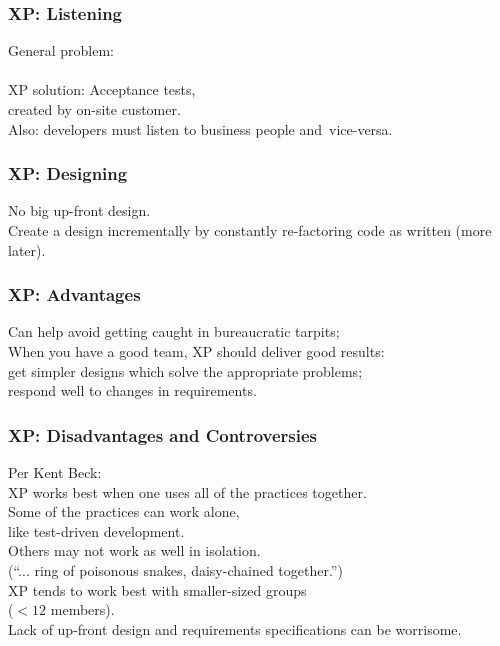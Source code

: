 \begin{frame}
\frametitle{XP: Listening}
\begin{changemargin}{2cm}

General problem: \\
\qquad {}\\[1em]

XP solution: Acceptance tests,\\
created by on-site customer.\\[1em]

Also: developers must listen to business people and~vice-versa.
\end{changemargin}
\end{frame}

\begin{frame}
\frametitle{XP: Designing}
\begin{changemargin}{2cm}

No big up-front design.\\[1em]

Create a design incrementally by constantly re-factoring code as
written (more later).
\end{changemargin}
\end{frame}

\begin{frame}
\frametitle{XP: Advantages}

\begin{changemargin}{1cm}
Can help avoid getting caught in bureaucratic tarpits;\\[1em]
When you have a good team, XP should deliver good results:\\
\qquad get simpler designs which solve the appropriate problems; \\
\qquad respond well to changes in requirements.
\end{changemargin}
\end{frame}

\begin{frame}
\frametitle{XP: Disadvantages and Controversies}

\begin{changemargin}{1cm}
Per Kent Beck: \\
\quad XP works best when one uses all of the practices
together. \\[1em]

Some of the practices can work alone, \\
like test-driven
development. \\[1em]

Others may not work as well in 
isolation.\\
\qquad (``... ring of poisonous snakes, daisy-chained together.'') \\[2em]

XP tends to work best with smaller-sized groups \\ \qquad ($< 12$ members).\\
Lack of up-front design and requirements specifications can be
worrisome.
\end{changemargin}
\end{frame}


